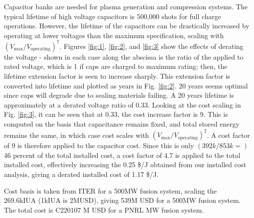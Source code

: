Capacitor banks are needed for plasma generation and compression systems. The typical lifetime of high voltage capacitors is 500,000 shots for full charge operations. However, the lifetime of the capacitors can be drastically increased by operating at lower voltages than the maximum specification, scaling with $(V_{\text{max}}/V_{\text{operating}})^7$. Figures \ref{fig:1}, \ref{fig:2}, and \ref{fig:3} show the effects of derating the voltage - shown in each case along the abscissa is the ratio of the applied to rated voltage, which is 1 if caps are charged to maximum rating; then, the lifetime extension factor is seen to increase sharply. This extension factor is converted into lifetime and plotted as years in Fig. \ref{fig:2}. 20 years seems optimal since caps will degrade due to sealing materials failing. A 20 years lifetime is approximately at a derated voltage ratio of 0.33. Looking at the cost scaling in Fig. \ref{fig:3}, it can be seen that at 0.33, the cost increase factor is 9. This is computed on the basis that capacitance remains fixed, and total stored energy remains the same, in which case cost scales with $(V_{\text{max}}/V_{\text{operating}})^2$. A cost factor of 9 is therefore applied to the capacitor cost. Since this is only $(392k/853k =)$ 46 percent of the total installed cost, a cost factor of 4.7 is applied to the total installed cost, effectively increasing the 0.25 \$/J obtained from our installed cost analysis, giving a derated installed cost of 1.17 \$/J.

Cost basis is taken from ITER for a 500MW fusion system, scaling the 269.6kIUA (1kIUA is 2MUSD), giving 539M USD for a 500MW fusion system. The total cost is C220107 M USD for a PNRL MW fusion system.






